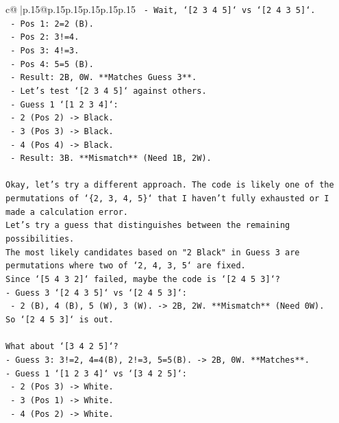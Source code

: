 \documentclass{article}
\begin{document}
{\begin{supertabular}{c@{$\;$}|p{.15\linewidth}@{}p{.15\linewidth}p{.15\linewidth}p{.15\linewidth}p{.15\linewidth}p{.15\linewidth}}
{{{\texttt{    {-} Wait, `{[}2 3 4 5{]}` vs `{[}2 4 3 5{]}`.} \\
\texttt{    {-} Pos 1: 2=2 (B).} \\
\texttt{    {-} Pos 2: 3!=4.} \\
\texttt{    {-} Pos 3: 4!=3.} \\
\texttt{    {-} Pos 4: 5=5 (B).} \\
\texttt{    {-} Result: 2B, 0W. **Matches Guess 3**.} \\
\texttt{    {-} Let's test `{[}2 3 4 5{]}` against others.} \\
\texttt{    {-} Guess 1 `{[}1 2 3 4{]}`:} \\
\texttt{        {-} 2 (Pos 2) {-}> Black.} \\
\texttt{        {-} 3 (Pos 3) {-}> Black.} \\
\texttt{        {-} 4 (Pos 4) {-}> Black.} \\
\texttt{        {-} Result: 3B. **Mismatch** (Need 1B, 2W).} \\
\\ 
\texttt{Okay, let's try a different approach. The code is likely one of the permutations of `\{2, 3, 4, 5\}` that I haven't fully exhausted or I made a calculation error.} \\
\texttt{Let's try a guess that distinguishes between the remaining possibilities.} \\
\texttt{The most likely candidates based on "2 Black" in Guess 3 are permutations where two of `2, 4, 3, 5` are fixed.} \\
\texttt{Since `{[}5 4 3 2{]}` failed, maybe the code is `{[}2 4 5 3{]}`?} \\
\texttt{{-} Guess 3 `{[}2 4 3 5{]}` vs `{[}2 4 5 3{]}`:} \\
\texttt{    {-} 2 (B), 4 (B), 5 (W), 3 (W). {-}> 2B, 2W. **Mismatch** (Need 0W).} \\
\texttt{So `{[}2 4 5 3{]}` is out.} \\
\\ 
\texttt{What about `{[}3 4 2 5{]}`?} \\
\texttt{{-} Guess 3: 3!=2, 4=4(B), 2!=3, 5=5(B). {-}> 2B, 0W. **Matches**.} \\
\texttt{{-} Guess 1 `{[}1 2 3 4{]}` vs `{[}3 4 2 5{]}`:} \\
\texttt{    {-} 2 (Pos 3) {-}> White.} \\
\texttt{    {-} 3 (Pos 1) {-}> White.} \\
\texttt{    {-} 4 (Pos 2) {-}> White.} \\
}}}
\end{supertabular}}
\end{document}
